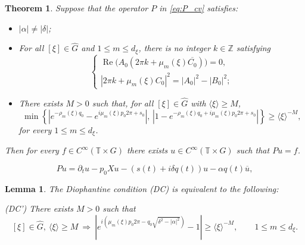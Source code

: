 \documentclass[10pt,a4paper]{amsart}
\newtheorem{theorem}{Theorem}
\newtheorem{lemma}{Lemma}
\begin{document}
	\begin{theorem}\label{thm:main_varcoef}
		Suppose that the operator $P$ in \eqref{eq:P_cv} satisfies:
		\begin{itemize}
			\item[(I)] $|\alpha|\neq|\delta|$;
			\item[(II)] For all $[\xi]\in\widehat{G}$ and $1\le m\le d_\xi$, there is no integer $k\in\mathbb{Z}$ satisfying
			\[
			\begin{cases}
				\operatorname{Re}\bigl(A_0(2\pi k+\mu_m(\xi)\overline{C_0})\bigr)=0,\\[2mm]
				|2\pi k+\mu_m(\xi)C_0|^2=|A_0|^2-|B_0|^2;
			\end{cases}
			\]
			\item[(III)] There exists $M>0$ such that, for all $[\xi]\in\widehat{G}$ with $\langle\xi\rangle\ge M$,
			\[
			\min\left\{
			\left|e^{-\rho_m(\xi) q_0}-e^{i\mu_m(\xi)p_0 2\pi+s_0}\right|,
			\,
			\left|1-e^{-\rho_m(\xi) q_0+i\mu_m(\xi)p_0 2\pi+s_0}\right|
			\right\}\ge \langle\xi\rangle^{-M},
			\]
			for every $1\le m\le d_\xi$.
		\end{itemize}
		
		Then for every $f\in C^\infty(\mathbb{T}\times G)$ there exists $u\in C^\infty(\mathbb{T}\times G)$ such that $Pu=f$.
	\end{theorem}

	\begin{equation}\label{eq:P_lambda0}
		Pu=\partial_t u-p_0Xu-(s(t)+i\delta q(t))u-\alpha q(t)\overline{u},
	\end{equation}

	\begin{lemma}\label{lem:dc_equiv}
		The Diophantine condition \textup{(DC)} is equivalent to the following:
		\medskip\noindent
		
		\textup{(DC')} There exists $M > 0$ such that
		\[
		[\xi] \in \widehat{G},\ \langle\xi\rangle \ge M
		\ \Longrightarrow\
		\left|e^{i(\mu_m(\xi)p_0 2\pi - q_0\sqrt{\delta^2 - |\alpha|^2})} - 1\right|
		\ge \langle\xi\rangle^{-M},
		\qquad 1 \le m \le d_\xi.
		\]
	\end{lemma}
\end{document}
